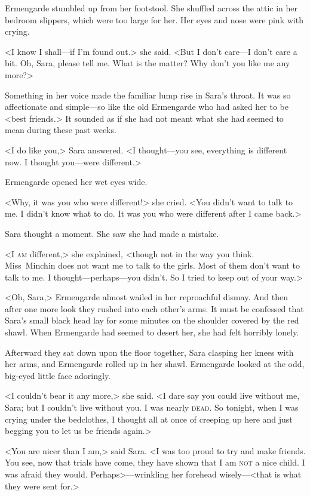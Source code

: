 Ermengarde stumbled up from her footstool. She shuffled across the attic in her bedroom slippers, which were too large for her. Her eyes and nose were pink with crying.

<I know I shall—if I'm found out.> she said. <But I don't care—I don't care a bit. Oh, Sara, please tell me. What is the matter? Why don't you like me any more?>

Something in her voice made the familiar lump rise in Sara's throat. It was so affectionate and simple—so like the old Ermengarde who had asked her to be <best friends.> It sounded as if she had not meant what she had seemed to mean during these past weeks.

<I do like you,> Sara answered. <I thought—you see, everything is different now. I thought you—were different.>

Ermengarde opened her wet eyes wide.

<Why, it was you who were different!> she cried. <You didn't want to talk to me. I didn't know what to do. It was you who were different after I came back.>

Sara thought a moment. She saw she had made a mistake.

<I \textsc{am} different,> she explained, <though not in the way you think. Miss~Minchin does not want me to talk to the girls. Most of them don't want to talk to me. I thought—perhaps—you didn't. So I tried to keep out of your way.>

<Oh, Sara,> Ermengarde almost wailed in her reproachful dismay. And then after one more look they rushed into each other's arms. It must be confessed that Sara's small black head lay for some minutes on the shoulder covered by the red shawl. When Ermengarde had seemed to desert her, she had felt horribly lonely.

Afterward they sat down upon the floor together, Sara clasping her knees with her arms, and Ermengarde rolled up in her shawl. Ermengarde looked at the odd, big-eyed little face adoringly.

<I couldn't bear it any more,> she said. <I dare say you could live without me, Sara; but I couldn't live without you. I was nearly \textsc{dead}. So tonight, when I was crying under the bedclothes, I thought all at once of creeping up here and just begging you to let us be friends again.>

<You are nicer than I am,> said Sara. <I was too proud to try and make friends. You see, now that trials have come, they have shown that I am \textsc{not} a nice child. I was afraid they would. Perhaps>—wrinkling her forehead wisely—<that is what they were sent for.>

